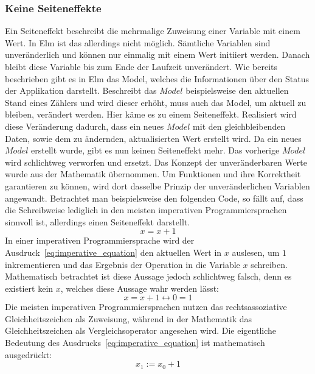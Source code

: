 \subsubsection{Keine Seiteneffekte}
\label{sec:Keine Seiteneffekte}
Ein Seiteneffekt beschreibt die mehrmalige Zuweisung einer Variable mit einem Wert. In Elm ist das allerdings nicht möglich. Sämtliche Variablen sind unveränderlich und können nur einmalig mit einem Wert initiiert werden. Danach bleibt diese Variable bis zum Ende der Laufzeit unverändert. Wie bereits beschrieben gibt es in Elm das Model, welches die Informationen über den Status der Applikation darstellt. Beschreibt das $Model$ beispielsweise den aktuellen Stand eines Zählers und wird dieser erhöht, muss auch das Model, um aktuell zu bleiben, verändert werden. Hier käme es zu einem Seiteneffekt. Realisiert wird diese Veränderung dadurch, dass ein neues $Model$ mit den gleichbleibenden Daten, sowie dem zu ändernden, aktualisierten Wert erstellt wird. Da ein neues $Model$ erstellt wurde, gibt es nun keinen Seiteneffekt mehr. Das vorherige $Model$ wird schlichtweg verworfen und ersetzt.
Das Konzept der unveränderbaren Werte wurde aus der Mathematik übernommen.  Um Funktionen und ihre Korrektheit garantieren zu können, wird dort dasselbe Prinzip der unveränderlichen Variablen angewandt. Betrachtet man beispielsweise den folgenden Code, so fällt auf, dass die Schreibweise lediglich in den meisten imperativen Programmiersprachen sinnvoll ist, allerdings einen Seiteneffekt darstellt.
\begin{equation} \label{eq:imperative_equation}
x = x + 1
\end{equation}
In einer imperativen Programmiersprache wird der Ausdruck~\ref{eq:imperative_equation} den aktuellen Wert in $x$ auslesen, um $1$ inkrementieren und das Ergebnis der Operation in die Variable $x$ schreiben.
Mathematisch betrachtet ist diese Aussage jedoch schlichtweg falsch, denn es existiert kein $x$, welches diese Aussage wahr werden lässt:
\begin{equation} \label{eq:mathematical_equation}
x=x+1 \leftrightarrow 0=1
\end{equation}
Die meisten imperativen Programmiersprachen nutzen das rechtsassoziative Gleichheitszeichen als Zuweisung, während in der Mathematik das Gleichheitszeichen als Vergleichsoperator angesehen wird.
Die eigentliche Bedeutung des Ausdrucks~\ref{eq:imperative_equation} ist mathematisch ausgedrückt:
\begin{equation} \label{eq:true_equation}
x_1:= x_0 + 1
\end{equation}
